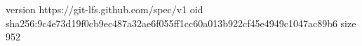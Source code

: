 version https://git-lfs.github.com/spec/v1
oid sha256:9c4e73d19f0cb9ec487a32ae6f055ff1cc60a013b922cf45e4949c1047ac89b6
size 952
